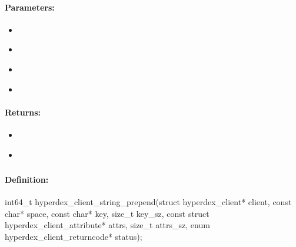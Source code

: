 \paragraph{Parameters:}
\begin{itemize}[noitemsep]
\item {}\\

\item {}\\

\item {}\\

\item {}\\

\end{itemize}

\paragraph{Returns:}
\begin{itemize}[noitemsep]
\item {}\\

\item {}\\

\end{itemize}

\pagebreak
\subsubsection{}
\label{api:c:string_prepend}


\paragraph{Definition:}
\begin{ccode}
int64_t hyperdex_client_string_prepend(struct hyperdex_client* client,
        const char* space,
        const char* key, size_t key_sz,
        const struct hyperdex_client_attribute* attrs, size_t attrs_sz,
        enum hyperdex_client_returncode* status);
\end{ccode}

